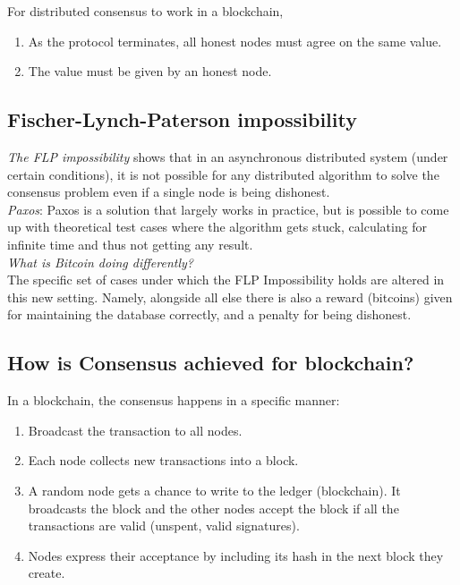\documentclass[10pt,a4paper]{article}
\begin{document}
For distributed consensus to work in a blockchain, 
\begin{enumerate}
\item As the protocol terminates, all honest nodes must agree on the same value.

\item The value must be given by an honest node.
\end{enumerate}

\subsection{Fischer-Lynch-Paterson impossibility}

\emph{The FLP impossibility} shows that in an asynchronous distributed system (under certain conditions), it is not possible for any distributed algorithm to solve the consensus problem even if a single node is being dishonest.\\

\emph{Paxos}: Paxos is a solution that largely works in practice, but is possible to come up with theoretical test cases where the algorithm gets stuck, calculating for infinite time and thus not getting any result.\\

\emph{What is Bitcoin doing differently?}\\
The specific set of cases under which the FLP Impossibility holds are altered in this new setting. Namely, alongside all else there is also a reward (bitcoins) given for maintaining the database correctly, and a penalty for being dishonest.

\subsection{How is Consensus achieved for blockchain?}

In a blockchain, the consensus happens in a specific manner:
\begin{enumerate}
\item Broadcast the transaction to all nodes.

\item Each node collects new transactions into a block.

\item A random node gets a chance to write to the ledger (blockchain). It broadcasts the block and the other nodes accept the block if all the transactions are valid (unspent, valid signatures).

\item Nodes express their acceptance by including its hash in the next block they create.
\end{enumerate}
\end{document}
